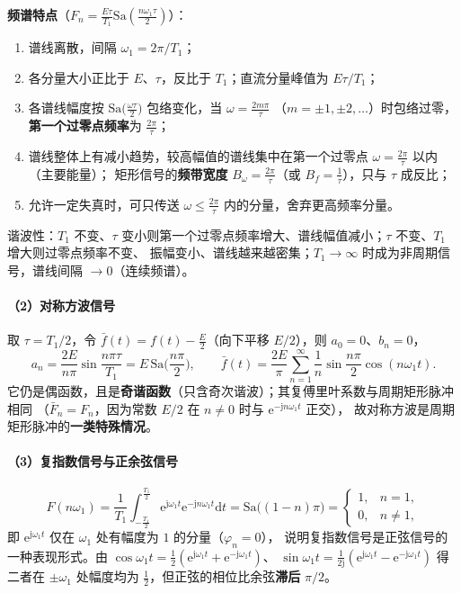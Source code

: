 \textbf{频谱特点}（$F_n=\frac{E\tau}{T_1}\mathrm{Sa}(\frac{n\omega_1\tau}{2})$）：
\begin{enumerate}
\item 谱线离散，间隔 $\omega_1=2\pi/T_1$；
\item 各分量大小正比于 $E$、$\tau$，反比于 $T_1$；直流分量峰值为 $E\tau/T_1$；
\item 各谱线幅度按 $\mathrm{Sa}\big(\frac{\omega\tau}{2}\big)$ 包络变化，当 $\omega=\frac{2m\pi}{\tau}$
  （$m=\pm1,\pm2,\dots$）时包络过零，\textbf{第一个过零点频率}为 $\frac{2\pi}{\tau}$；
\item 谱线整体上有减小趋势，较高幅值的谱线集中在第一个过零点 $\omega=\frac{2\pi}{\tau}$ 以内（主要能量）；
  矩形信号的\textbf{频带宽度} $B_\omega=\frac{2\pi}{\tau}$（或 $B_f=\frac{1}{\tau}$），只与 $\tau$ 成反比；
\item 允许一定失真时，可只传送 $\omega\le\frac{2\pi}{\tau}$ 内的分量，舍弃更高频率分量。
\end{enumerate}
谐波性：$T_1$ 不变、$\tau$ 变小则第一个过零点频率增大、谱线幅值减小；$\tau$ 不变、$T_1$ 增大则过零点频率不变、
振幅变小、谱线越来越密集；$T_1\to\infty$ 时成为非周期信号，谱线间隔 $\to0$（连续频谱）。

\paragraph{（2）对称方波信号}
取 $\tau=T_1/2$，令 $\bar f(t)=f(t)-\frac{E}{2}$（向下平移 $E/2$），则
$a_0=0$、$b_n=0$，
\begin{equation}
a_n=\frac{2E}{n\pi}\sin\frac{n\pi\tau}{T_1}=E\,\mathrm{Sa}\Big(\frac{n\pi}{2}\Big),\qquad
\bar f(t)=\frac{2E}{\pi}\sum_{n=1}^{\infty}\frac{1}{n}\sin\frac{n\pi}{2}\cos(n\omega_1t).
\end{equation}
它仍是偶函数，且是\textbf{奇谐函数}（只含奇次谐波）；其复傅里叶系数与周期矩形脉冲相同
（$\bar F_n=F_n$，因为常数 $E/2$ 在 $n\neq0$ 时与 $\mathrm{e}^{-\mathrm{j}n\omega_1t}$ 正交），
故对称方波是周期矩形脉冲的\textbf{一类特殊情况}。

\paragraph{（3）复指数信号与正余弦信号}
\begin{equation}
F(n\omega_1)=\frac{1}{T_1}\int_{-\frac{T_1}{2}}^{\frac{T_1}{2}}
\mathrm{e}^{\mathrm{j}\omega_1t}\mathrm{e}^{-\mathrm{j}n\omega_1t}\mathrm{d}t
=\mathrm{Sa}\big((1-n)\pi\big)=
\begin{cases}
1, & n=1,\\
0, & n\neq1,
\end{cases}
\end{equation}
即 $\mathrm{e}^{\mathrm{j}\omega_1t}$ 仅在 $\omega_1$ 处有幅度为 $1$ 的分量（$\varphi_n=0$），
说明复指数信号是正弦信号的一种表现形式。由
$\cos\omega_1t=\frac12(\mathrm{e}^{\mathrm{j}\omega_1t}+\mathrm{e}^{-\mathrm{j}\omega_1t})$、
$\sin\omega_1t=\frac{1}{2\mathrm{j}}(\mathrm{e}^{\mathrm{j}\omega_1t}-\mathrm{e}^{-\mathrm{j}\omega_1t})$ 得
二者在 $\pm\omega_1$ 处幅度均为 $\frac12$，但正弦的相位比余弦\textbf{滞后} $\pi/2$。

